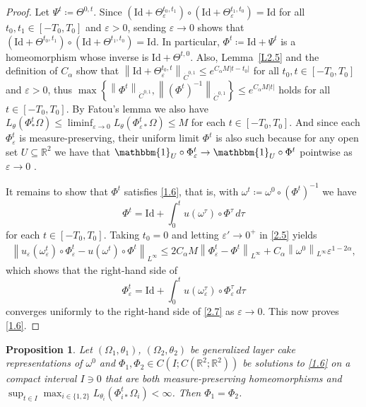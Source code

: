 \documentclass[reqno,centertags,12pt]{amsart}
\newtheorem{proposition}[theorem]{Proposition}
\theoremstyle{definition}
\numberwithin{equation}{section}
\newcommand{\abs}[1]{\left\lvert#1\right\rvert}
\newcommand{\norm}[1]{\left\|#1\right\|}
\newcommand{\set}[1]{\left\{ #1 \right\}}
\newcommand{\bbR}{{\mathbb{R}}}
\newcommand{\eps}{\varepsilon}
\newcommand{\tht}{\theta}
\begin{document}
\begin{proof}
    Let $\Psi^{t}\coloneqq\Theta^{0,t}$.
    Since $(\mathrm{Id} + \Theta_{\eps}^{t_{0},t_{1}})
    \circ(\mathrm{Id}+\Theta_{\eps}^{t_{1},t_{0}}) = \mathrm{Id}$  for
    all $t_{0},t_{1}\in[-T_{0},T_{0}]$ and $\eps>0$, sending $\eps\to 0$ shows that
    $(\mathrm{Id} + \Theta^{t_{0},t_{1}})
    \circ(\mathrm{Id} + \Theta^{t_{1},t_{0}}) = \mathrm{Id}$.  In particular,
    $\Phi^{t}\coloneqq \mathrm{Id} + \Psi^{t}$ is a homeomorphism whose inverse is
    $\mathrm{Id} + \Theta^{t,0}$.
    Also, Lemma~\ref{L2.5} and the definition of $C_{\alpha}$ show that
    $\norm{\mathrm{Id} + \Theta_{\eps}^{t_{0},t}}_{\dot{C}^{0,1}}
    \leq e^{C_{\alpha}M\abs{t - t_{0}}}$ for all $t_{0},t\in[-T_{0},T_{0}]$ and $\eps>0$, thus
    $\max\set{\norm{\Phi^{t}}_{\dot{C}^{0,1}}, \norm{(\Phi^{t})^{-1}}_{\dot{C}^{0,1}}}
    \leq e^{C_{\alpha}M\abs{t}}$ holds for all $t\in[-T_{0},T_{0}]$.
    By Fatou's lemma we also have $L_{\tht}(\Phi_{*}^{t}\Omega)
    \leq \liminf_{\eps\to 0}L_{\tht}(\Phi_{\eps*}^{t}\Omega) \leq M$ for each $t\in[-T_{0},T_{0}]$.
   And since each $\Phi_{\eps}^{t}$ is measure-preserving,
    their uniform limit $\Phi^{t}$ is also such because for any open set $U\subseteq\bbR^{2}$ we have that
    $\mathbbm{1}_{U}\circ\Phi_{\eps}^{t}\to \mathbbm{1}_{U}\circ\Phi^{t}$ pointwise as $\eps\to 0$ .

    It remains to show that $\Phi^{t}$ satisfies \eqref{1.6}, that is,
    with $\omega^{t}\coloneqq\omega^{0}\circ (\Phi^{t})^{-1}$ we have
    \begin{equation}\label{2.7}
        \Phi^{t} = \mathrm{Id} + \int_{0}^{t}
        u(\omega^{\tau})\circ\Phi^{\tau}\,d\tau
    \end{equation}
    for each $t\in[-T_{0},T_{0}]$.
    Taking $t_{0} = 0$ and letting $\eps'\to 0^{+}$ in \eqref{2.5} yields
    \begin{align*}
        \norm{u_{\eps}(\omega_{\eps}^{t})\circ \Phi_{\eps}^{t}
        - u(\omega^{t})\circ \Phi^{t}}_{L^{\infty}}
        \leq 2C_{\alpha}M\norm{\Phi_{\eps}^{t} - \Phi^{t}}_{L^{\infty}}
        + C_{\alpha}\norm{\omega^{0}}_{L^{\infty}}\eps^{1-2\alpha},
    \end{align*}
    which shows that the right-hand side of
    \[
        \Phi_{\eps}^{t} = \mathrm{Id} + \int_{0}^{t}
        u(\omega_{\eps}^{\tau})\circ \Phi_{\eps}^{\tau}\,d\tau
    \]
    converges uniformly to the right-hand side of \eqref{2.7}
    as $\eps\to 0$. This now proves \eqref{1.6}.
\end{proof}

\begin{proposition}\label{P2.9}
    Let $(\Omega_{1},\theta_{1})$, $(\Omega_{2},\theta_{2})$ be
    generalized layer cake representations of $\omega^{0}$ and
    $\Phi_{1},\Phi_{2}\in C\left(I;C(\bbR^{2};\bbR^{2})\right)$ be solutions to \eqref{1.6}
    on a compact interval $I\ni 0$ that are  both measure-preserving homeomorphisms and
    $\sup_{t\in I}\max_{i\in\{1,2\}}L_{\theta_{i}}(\Phi_{i*}^{t}\Omega_{i}) <\infty$.
    Then $\Phi_{1} = \Phi_{2}$.
\end{proposition}
\end{document}
